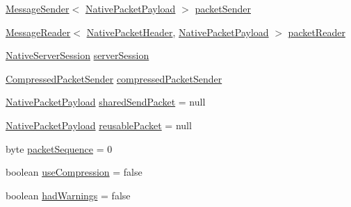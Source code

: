 \begin{DoxyCompactItemize}
\item 
\mbox{\hyperlink{interfacecom_1_1mysql_1_1cj_1_1protocol_1_1_message_sender}{Message\+Sender}}$<$ \mbox{\hyperlink{classcom_1_1mysql_1_1cj_1_1protocol_1_1a_1_1_native_packet_payload}{Native\+Packet\+Payload}} $>$ \mbox{\hyperlink{classcom_1_1mysql_1_1cj_1_1protocol_1_1a_1_1_native_protocol_aa922ca09ca0ae78cadca82997cf8dd2f}{packet\+Sender}}
\item 
\mbox{\hyperlink{interfacecom_1_1mysql_1_1cj_1_1protocol_1_1_message_reader}{Message\+Reader}}$<$ \mbox{\hyperlink{classcom_1_1mysql_1_1cj_1_1protocol_1_1a_1_1_native_packet_header}{Native\+Packet\+Header}}, \mbox{\hyperlink{classcom_1_1mysql_1_1cj_1_1protocol_1_1a_1_1_native_packet_payload}{Native\+Packet\+Payload}} $>$ \mbox{\hyperlink{classcom_1_1mysql_1_1cj_1_1protocol_1_1a_1_1_native_protocol_af7c9240665a625d0b23bc988f8d90090}{packet\+Reader}}
\item 
\mbox{\hyperlink{classcom_1_1mysql_1_1cj_1_1protocol_1_1a_1_1_native_server_session}{Native\+Server\+Session}} \mbox{\hyperlink{classcom_1_1mysql_1_1cj_1_1protocol_1_1a_1_1_native_protocol_afc3a2eecce6580bb77f9c6564d652482}{server\+Session}}
\item 
\mbox{\hyperlink{classcom_1_1mysql_1_1cj_1_1protocol_1_1a_1_1_compressed_packet_sender}{Compressed\+Packet\+Sender}} \mbox{\hyperlink{classcom_1_1mysql_1_1cj_1_1protocol_1_1a_1_1_native_protocol_a3fa25ff62eafecd246c6c47258a7ae80}{compressed\+Packet\+Sender}}
\item 
\mbox{\hyperlink{classcom_1_1mysql_1_1cj_1_1protocol_1_1a_1_1_native_packet_payload}{Native\+Packet\+Payload}} \mbox{\hyperlink{classcom_1_1mysql_1_1cj_1_1protocol_1_1a_1_1_native_protocol_a78f6d0f4e7668aad319c35d72b469dc0}{shared\+Send\+Packet}} = null
\item 
\mbox{\hyperlink{classcom_1_1mysql_1_1cj_1_1protocol_1_1a_1_1_native_packet_payload}{Native\+Packet\+Payload}} \mbox{\hyperlink{classcom_1_1mysql_1_1cj_1_1protocol_1_1a_1_1_native_protocol_a3cbc16a90deb548d74da81685a49216d}{reusable\+Packet}} = null
\item 
byte \mbox{\hyperlink{classcom_1_1mysql_1_1cj_1_1protocol_1_1a_1_1_native_protocol_a102da65acee58a628e60310293623fb7}{packet\+Sequence}} = 0
\item 
boolean \mbox{\hyperlink{classcom_1_1mysql_1_1cj_1_1protocol_1_1a_1_1_native_protocol_af6bd84239db260ea265898450bbc9e39}{use\+Compression}} = false
\item 
boolean \mbox{\hyperlink{classcom_1_1mysql_1_1cj_1_1protocol_1_1a_1_1_native_protocol_a6cb2c60a1acd72e99a1a40b162947c08}{had\+Warnings}} = false

\end{DoxyCompactItemize}
